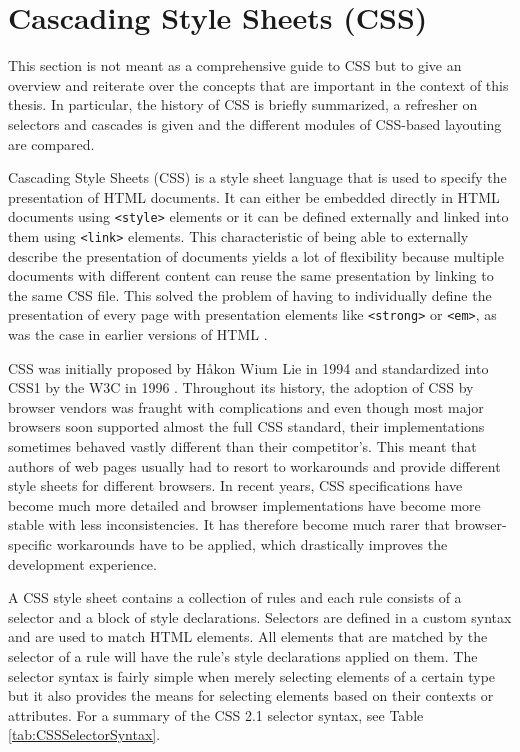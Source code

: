 \section{Cascading Style Sheets (CSS)}
\label{sec:CSS}

This section is not meant as a comprehensive guide to CSS but to give an overview and reiterate over the concepts that are important in the context of this thesis. In particular, the history of CSS is briefly summarized, a refresher on selectors and cascades is given and the different modules of CSS-based layouting are compared.

Cascading Style Sheets (CSS) is a style sheet language that is used to specify the presentation of HTML documents. It can either be embedded directly in HTML documents using \lstinline{<style>} elements or it can be defined externally and linked into them using \lstinline{<link>} elements. This characteristic of being able to externally describe the presentation of documents yields a lot of flexibility because multiple documents with different content can reuse the same presentation by linking to the same CSS file. This solved the problem of having to individually define the presentation of every page with presentation elements like \lstinline{<strong>} or \lstinline{<em>}, as was the case in earlier versions of HTML \parencite{HTML32}.

CSS was initially proposed by Håkon Wium Lie in 1994 \parencite{CSSProposal} and standardized into CSS1 by the W3C in 1996 \parencite{CSS1}. Throughout its history, the adoption of CSS by browser vendors was fraught with complications and even though most major browsers soon supported almost the full CSS standard, their implementations sometimes behaved vastly different than their competitor's. This meant that authors of web pages usually had to resort to workarounds and provide different style sheets for different browsers. In recent years, CSS specifications have become much more detailed \parencite{CSS21} and browser implementations have become more stable with less inconsistencies. It has therefore become much rarer that browser-specific workarounds have to be applied, which drastically improves the development experience.

A CSS style sheet contains a collection of rules and each rule consists of a selector and a block of style declarations. Selectors are defined in a custom syntax and are used to match HTML elements. All elements that are matched by the selector of a rule will have the rule's style declarations applied on them. The selector syntax is fairly simple when merely selecting elements of a certain type but it also provides the means for selecting elements based on their contexts or attributes. For a summary of the CSS 2.1 selector syntax, see Table \ref{tab:CSSSelectorSyntax}.

